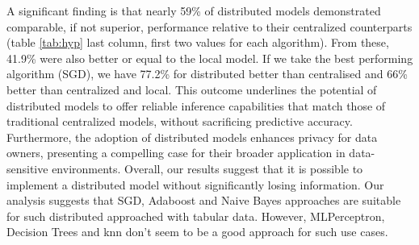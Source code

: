 


A significant finding is that nearly 59\% of distributed models demonstrated comparable, if not superior, performance relative to their centralized counterparts (table \ref{tab:hyp} last column, first two values for each algorithm). From these, 41.9\% were also better or equal to the local model. If we take the best performing algorithm (SGD), we have 77.2\% for distributed better than centralised and 66\% better than centralized and local. This outcome underlines the potential of distributed models to offer reliable inference capabilities that match those of traditional centralized models, without sacrificing predictive accuracy. Furthermore, the adoption of distributed models enhances privacy for data owners, presenting a compelling case for their broader application in data-sensitive environments. Overall, our results suggest that it is possible to implement a distributed model without significantly losing information. Our analysis suggests that SGD, Adaboost and Naive Bayes approaches are suitable for such distributed approached with tabular data. However, MLPerceptron, Decision Trees and \ac{knn} don't seem to be a good approach for such use cases.

